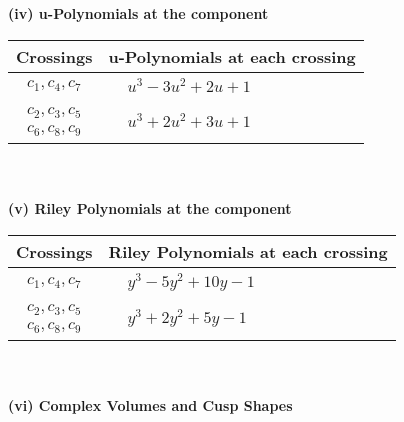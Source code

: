 \documentclass[1p]{elsarticle_modified}
\theoremstyle{definition}
\begin{document}
\newpage\renewcommand{\arraystretch}{1}
\flushleft \textbf{(iv) u-Polynomials at the component}\newline \\
\begin{tabular}{m{50pt}|m{274pt}}
Crossings & \hspace{64pt}u-Polynomials at each crossing \\
\hline $$\begin{aligned}c_{1},c_{4},c_{7}\end{aligned}$$&$\begin{aligned}
&u^3-3 u^2+2 u+1
\end{aligned}$\\
\hline $$\begin{aligned}c_{2},c_{3},c_{5}\\c_{6},c_{8},c_{9}\end{aligned}$$&$\begin{aligned}
&u^3+2 u^2+3 u+1
\end{aligned}$\\
\hline
\end{tabular}\\~\\
\newpage\renewcommand{\arraystretch}{1}
\flushleft \textbf{(v) Riley Polynomials at the component}\newline \\
\begin{tabular}{m{50pt}|m{274pt}}
Crossings & \hspace{64pt}Riley Polynomials at each crossing \\
\hline $$\begin{aligned}c_{1},c_{4},c_{7}\end{aligned}$$&$\begin{aligned}
&y^3-5 y^2+10 y-1
\end{aligned}$\\
\hline $$\begin{aligned}c_{2},c_{3},c_{5}\\c_{6},c_{8},c_{9}\end{aligned}$$&$\begin{aligned}
&y^3+2 y^2+5 y-1
\end{aligned}$\\
\hline
\end{tabular}\\~\\
\newpage\flushleft \textbf{(vi) Complex Volumes and Cusp Shapes}
\end{document}
